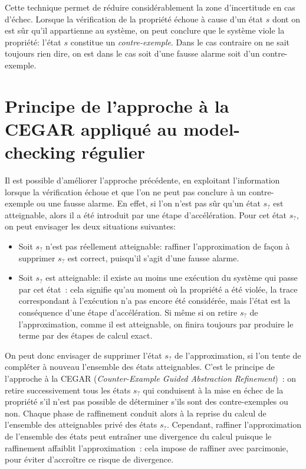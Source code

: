 Cette technique permet de réduire considérablement la zone d'incertitude en cas d'échec.
Lorsque la vérification de la propriété échoue à cause d'un état $s$ dont on est sûr
qu'il appartienne au système, on peut conclure que le système viole la propriété:
l'état $s$ constitue un \emph{contre-exemple}. Dans le cas contraire on ne sait toujours rien dire,
on est  dans le cas soit d'une fausse alarme soit d'un contre-exemple.

\section{Principe de l'approche à la {CEGAR} appliqué au model-checking régulier}

Il est possible d'améliorer l'approche précédente, en exploitant l'information
lorsque la vérification échoue et que l'on ne peut pas conclure à un contre-exemple ou une fausse alarme.
En effet, si l'on n'est pas sûr qu'un état $s_?$ est atteignable, alors il a été introduit par une étape d'accélération.
Pour cet état $s_?$, on peut envisager les deux situations suivantes:

\begin{itemize}
\item
  Soit $s_?$ n'est pas réellement atteignable: raffiner l'approximation de façon
  à supprimer $s_?$ est correct, puisqu'il s'agit d'une fausse alarme.
\item
  Soit $s_?$ est atteignable: il existe au moins une exécution du système qui passe par cet état~:
  cela signifie qu'au moment où la propriété a été violée, la trace correspondant à l'exécution
  n'a pas encore été considérée, mais l'état est la conséquence d'une étape d'accélération. 
  Si même si on retire $s_?$ de l'approximation, comme il est atteignable, on finira toujours
  par produire le terme par des étapes de calcul exact. 
\end{itemize}
On peut donc envisager de supprimer l'état $s_?$ de l'approximation, si l'on tente de compléter à nouveau
l'ensemble des états atteignables. C'est le principe de l'approche à la {CEGAR}
(\emph{Counter-Example Guided Abstraction Refinement})~\cite{DBLP:conf/time/Clarke03}: on retire successivement tous les
états $s_?$ qui conduisent à la mise en échec de la propriété s'il n'est pas possible
de déterminer s'ils sont des contre-exemples ou non. Chaque phase de raffinement conduit 
alors à la reprise du calcul de l'ensemble des atteignables privé des états $s_?$.
Cependant, raffiner l'approximation de l'ensemble des états peut entraîner une divergence du calcul
puisque le raffinement affaiblit l'approximation~: cela impose de raffiner avec parcimonie, pour
éviter d'accroître ce risque de divergence.


